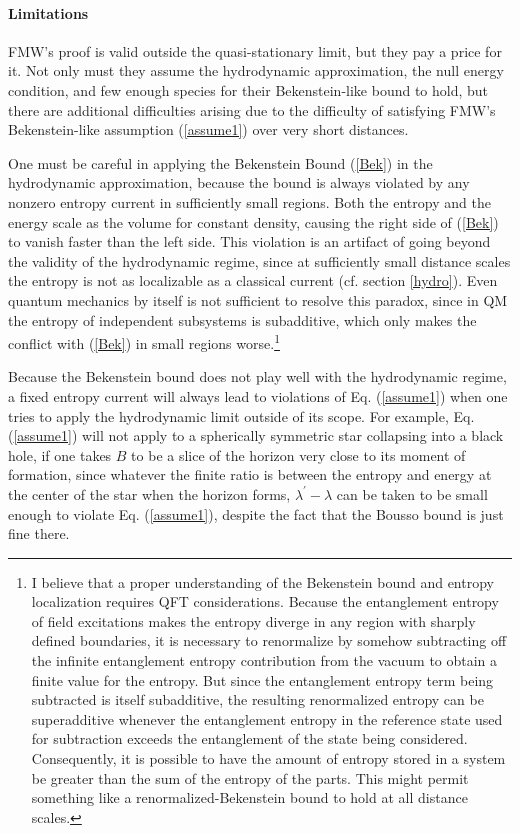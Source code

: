 \documentclass{article}
\begin{document}
\paragraph{Limitations}

FMW's proof is valid outside the quasi-stationary limit, but they pay a price for it.  Not only must they assume the hydrodynamic approximation, the null energy condition, and few enough species for their Bekenstein-like bound to hold, but there are additional difficulties arising due to the difficulty of satisfying FMW's Bekenstein-like assumption (\ref{assume1}) over very short distances.

One must be careful in applying the Bekenstein Bound (\ref{Bek}) in the hydrodynamic approximation, because the bound is always violated by any nonzero entropy current in sufficiently small regions.  Both the entropy and the energy scale as the volume for constant density, causing the right side of (\ref{Bek}) to vanish faster than the left side.  This violation is an artifact of going beyond the validity of the hydrodynamic regime, since at sufficiently small distance scales the entropy is not as localizable as a classical current (cf. section \ref{hydro}).  Even quantum mechanics by itself is not sufficient to resolve this paradox, since in QM the entropy of independent subsystems is subadditive, which only makes the conflict with (\ref{Bek}) in small regions worse.\footnote{I believe that a proper understanding of the Bekenstein bound and entropy localization requires QFT considerations.  Because the entanglement entropy of field excitations makes the entropy diverge in any region with sharply defined boundaries, it is necessary to renormalize by somehow subtracting off the infinite entanglement entropy contribution from the vacuum to obtain a finite value for the entropy.  But since the entanglement entropy term being subtracted is itself subadditive, the resulting renormalized entropy can be superadditive whenever the entanglement entropy in the reference state used for subtraction exceeds the entanglement of the state being considered.  Consequently, it is possible to have the amount of entropy stored in a system be greater than the sum of the entropy of the parts.  This might permit something like a renormalized-Bekenstein bound to hold at all distance scales.}

Because the Bekenstein bound does not play well with the hydrodynamic regime, a fixed entropy current will always lead to violations of Eq. (\ref{assume1}) when one tries to apply the hydrodynamic limit outside of its scope.  For example, Eq. (\ref{assume1}) will not apply to a spherically symmetric star collapsing into a black hole, if one takes $B$ to be a slice of the horizon very close to its moment of formation, since whatever the finite ratio is between the entropy and energy at the center of the star when the horizon forms, $\lambda^{\prime} - \lambda$ can be taken to be small enough to violate Eq. (\ref{assume1}), despite the fact that the Bousso bound is just fine there.
\end{document}
